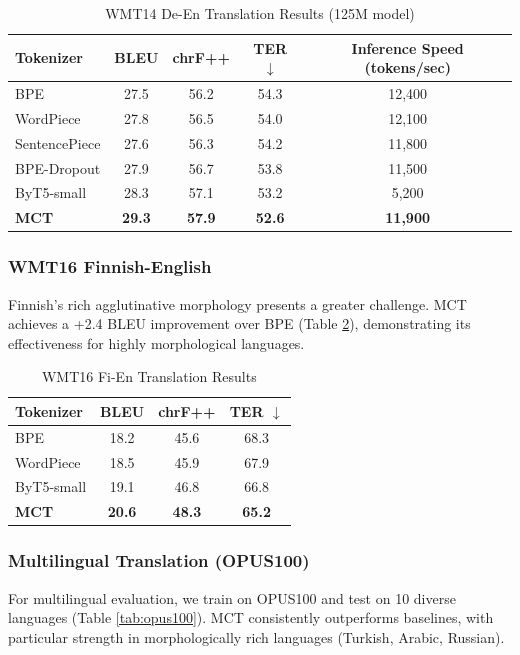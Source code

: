 \documentclass[conference]{IEEEtran}
\begin{document}
\begin{table}[h]
\centering
\caption{WMT14 De-En Translation Results (125M model)}
\label{tab:wmt14}
\begin{tabular}{lcccc}
\toprule
\textbf{Tokenizer} & \textbf{BLEU} & \textbf{chrF++} & \textbf{TER} $\downarrow$ & \textbf{Inference Speed (tokens/sec)} \\
\midrule
BPE & 27.5 & 56.2 & 54.3 & 12,400 \\
WordPiece & 27.8 & 56.5 & 54.0 & 12,100 \\
SentencePiece & 27.6 & 56.3 & 54.2 & 11,800 \\
BPE-Dropout & 27.9 & 56.7 & 53.8 & 11,500 \\
ByT5-small & 28.3 & 57.1 & 53.2 & 5,200 \\
\textbf{MCT} & \textbf{29.3} & \textbf{57.9} & \textbf{52.6} & \textbf{11,900} \\
\bottomrule
\end{tabular}
\end{table}

\subsubsection{WMT16 Finnish-English}
Finnish's rich agglutinative morphology presents a greater challenge. MCT achieves a +2.4 BLEU improvement over BPE (Table \ref{tab:wmt16}), demonstrating its effectiveness for highly morphological languages.

\begin{table}[h]
\centering
\caption{WMT16 Fi-En Translation Results}
\label{tab:wmt16}
\begin{tabular}{lccc}
\toprule
\textbf{Tokenizer} & \textbf{BLEU} & \textbf{chrF++} & \textbf{TER} $\downarrow$ \\
\midrule
BPE & 18.2 & 45.6 & 68.3 \\
WordPiece & 18.5 & 45.9 & 67.9 \\
ByT5-small & 19.1 & 46.8 & 66.8 \\
\textbf{MCT} & \textbf{20.6} & \textbf{48.3} & \textbf{65.2} \\
\bottomrule
\end{tabular}
\end{table}

\subsubsection{Multilingual Translation (OPUS100)}
For multilingual evaluation, we train on OPUS100 and test on 10 diverse languages (Table \ref{tab:opus100}). MCT consistently outperforms baselines, with particular strength in morphologically rich languages (Turkish, Arabic, Russian).
\end{document}
